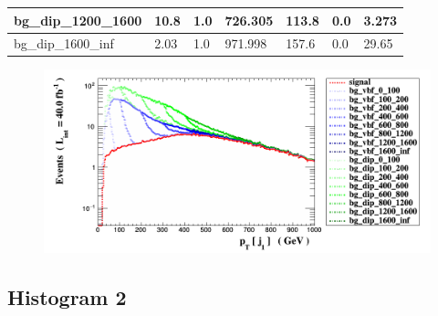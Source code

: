 \documentclass[a4paper, 10pt]{article}
\begin{document}
\begin{table}[H]
\begin{center}
\begin{tabular}{|m{23.0mm}|m{23.0mm}|m{18.0mm}|m{19.0mm}|m{19.0mm}|m{19.0mm}|m{19.0mm}|}
      \hline
      {\cellcolor{white}         bg\_dip\_1200\_1600}& {\cellcolor{white}         10.8}& {\cellcolor{white}         1.0}& {\cellcolor{white}         726.305}& {\cellcolor{white}         113.8}& {\cellcolor{green}         0.0}& {\cellcolor{green}         3.273}\\
      \hline
      {\cellcolor{white}         bg\_dip\_1600\_inf}& {\cellcolor{white}         2.03}& {\cellcolor{white}         1.0}& {\cellcolor{white}         971.998}& {\cellcolor{white}         157.6}& {\cellcolor{red}         0.0}& {\cellcolor{red}         29.65}\\
\hline
    \end{tabular}
  \end{center}
\end{table}

\begin{figure}[H]
  \begin{center}
    \includegraphics[scale=0.45]{selection_0.png}\\
\caption{   }
  \end{center}
\end{figure}
      \newpage
\subsection{ Histogram 2}
\end{document}
